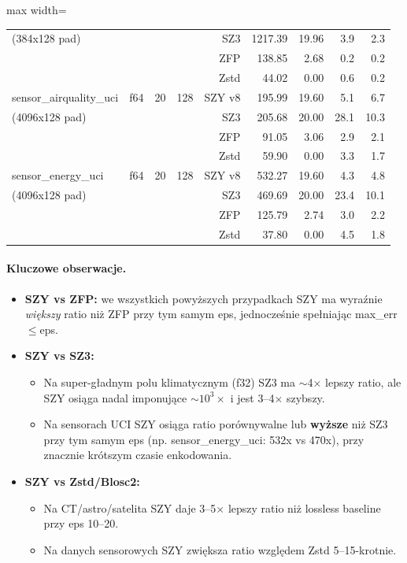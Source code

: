 \documentclass[11pt,a4paper]{article}
\begin{document}
\begin{table}[H]
\begin{adjustbox}{max width=\textwidth}
\begin{tabular}{@{}llrrrrrrr@{}}
(384x128 pad)             &     &    &     & SZ3    &1217.39 &19.96 & 3.9 & 2.3 \\
                          &     &    &     & ZFP    &138.85 & 2.68 & 0.2 & 0.2 \\
                          &     &    &     & Zstd   & 44.02 & 0.00 & 0.6 & 0.2 \\
\midrule
sensor\_airquality\_uci & f64 & 20 & 128 & SZY v8 &195.99 &19.60 & 5.1 & 6.7 \\
(4096x128 pad)          &     &    &     & SZ3    &205.68 &20.00 &28.1 &10.3 \\
                        &     &    &     & ZFP    &91.05 & 3.06 & 2.9 & 2.1 \\
                        &     &    &     & Zstd   &59.90 & 0.00 & 3.3 & 1.7 \\
\midrule
sensor\_energy\_uci & f64 & 20 & 128 & SZY v8 &532.27 &19.60 & 4.3 & 4.8 \\
(4096x128 pad)      &     &    &     & SZ3    &469.69 &20.00 &23.4 &10.1 \\
                    &     &    &     & ZFP    &125.79 & 2.74 & 3.0 & 2.2 \\
                    &     &    &     & Zstd   &37.80 & 0.00 & 4.5 & 1.8 \\
\bottomrule
\end{tabular}
\end{adjustbox}
\end{table}

\paragraph{Kluczowe obserwacje.}
\begin{itemize}
  \item \textbf{SZY vs ZFP:} we wszystkich powyższych przypadkach SZY ma wyraźnie \emph{większy} ratio niż ZFP przy tym samym eps, jednocześnie spełniając max\_err$\le$eps.
  \item \textbf{SZY vs SZ3:}
        \begin{itemize}
          \item Na super-gładnym polu klimatycznym (f32) SZ3 ma $\sim$4$\times$ lepszy ratio, ale SZY osiąga nadal imponujące $\sim 10^3\times$ i jest 3--4$\times$ szybszy.
          \item Na sensorach UCI SZY osiąga ratio porównywalne lub \textbf{wyższe} niż SZ3 przy tym samym eps (np. sensor\_energy\_uci: 532x vs 470x), przy znacznie krótszym czasie enkodowania.
        \end{itemize}
  \item \textbf{SZY vs Zstd/Blosc2:}
        \begin{itemize}
          \item Na CT/astro/satelita SZY daje 3--5$\times$ lepszy ratio niż lossless baseline przy eps 10--20.
          \item Na danych sensorowych SZY zwiększa ratio względem Zstd 5--15-krotnie.
        \end{itemize}
\end{itemize}
\end{document}
